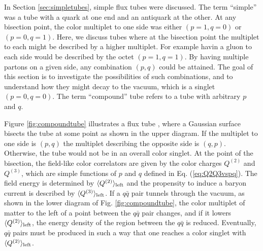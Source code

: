 \documentclass[aps, prc, 12pt, nofootinbib, showpacs, superscriptaddress, tightenlines, groupedaddress]{revtex4-2}
\begin{document}
In Section \ref{sec:simpletubes}, simple flux tubes were discussed. The term ``simple'' was a tube with a quark at one end and an antiquark at the other. At any bisection point, the color multiplet to one side was either $(p=1,q=0)$ or $(p=0,q=1)$. Here, we discuss tubes where at the bisection point the multiplet to each might be described by a higher multiplet. For example havin a gluon to each side would be described by the octet $(p=1,q=1)$. By having multiple partons on a given side, any combination $(p,q)$ could be attained. The goal of this section is to investigate the possibilities of such combinations, and to understand how they might decay to the vacuum, which is a singlet $(p=0,q=0)$. The term ``compound'' tube refers to a tube with arbitrary $p$ and $q$. 

Figure \ref{fig:compoundtube} illustrates a flux tube , where a Gaussian surface bisects the tube at some point as shown in the upper diagram. If the multiplet to one side is $(p,q)$ the multiplet describing the opposite side is $(q,p)$. Otherwise, the tube would not be in an overall color singlet. At the point of the bisection, the field-like color correlators are given by the color charges $Q^{(2)}$ and $Q^{(3)}$, which are simple functions of $p$ and $q$ defined in Eq. (\ref{eq:Q2Q3vspq}). The field energy is determined by $\langle Q^{(2)}\rangle_{\rm left}$ and the propensity to induce a baryon current is described by $\langle Q^{(3)}\rangle_{\rm left}$. If a $q\bar{q}$ pair tunnels through the vacuum, as shown in the lower diagram of Fig. \ref{fig:compoundtube}, the color multiplet of matter to the left of a point between the $q\bar{q}$ pair changes, and if it lowers $\langle Q^{(2)}\rangle_{\rm left}$, the energy density of the region between the $q\bar{q}$ is reduced. Eventually, $q\bar{q}$ pairs must be produced in such a way that one reaches a color singlet with $\langle Q^{(2)}\rangle_{\rm left}$.
\end{document}
